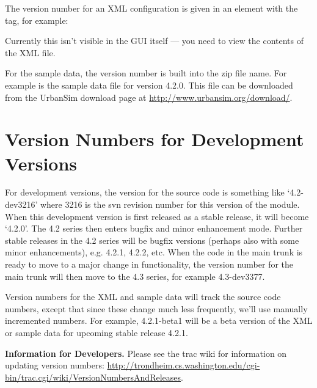 The version number for an XML configuration is given in an element with the
 tag, for example:


Currently this isn't visible in the GUI itself --- you need to view the
contents of the XML file.

For the sample data, the version number is built into the zip file name.
For example  is the sample data file for version
4.2.0.  This file can be downloaded from the UrbanSim download page at
\url{http://www.urbansim.org/download/}.

\section{Version Numbers for Development Versions}

For development versions, the version for the source code is something like
`4.2-dev3216' where 3216 is the svn revision number for this version of the
module. When this development version is first released as a stable
release, it will become `4.2.0'. The 4.2 series then enters bugfix and
minor enhancement mode.  Further stable releases in the 4.2 series will be
bugfix versions (perhaps also with some minor enhancements), e.g. 4.2.1,
4.2.2, etc.  When the code in the main trunk is ready to move to a major
change in functionality, the version number for the main trunk will then
move to the 4.3 series, for example 4.3-dev3377.

Version numbers for the XML and sample data will track the source code
numbers, except that since these change much less frequently, we'll use
manually incremented numbers.  For example, 4.2.1-beta1 will be a beta
version of the XML or sample data for upcoming stable release 4.2.1.

{\bf Information for Developers.}  Please see the trac wiki for information
on updating version numbers:
\url{http://trondheim.cs.washington.edu/cgi-bin/trac.cgi/wiki/VersionNumbersAndReleases}.

